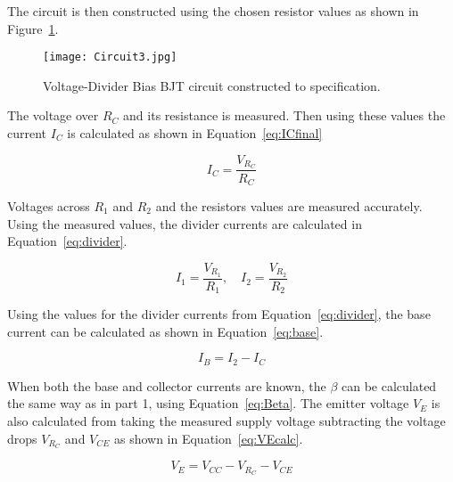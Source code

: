 \documentclass{article}
\begin{document}
The circuit is then constructed using the chosen resistor values as shown in Figure~\ref{fig:circuit3}.

\begin{figure}[H]
    \centering
    \texttt{[image: Circuit3.jpg]}
    \caption{Voltage-Divider Bias BJT circuit constructed to specification.}
    \label{fig:circuit3}
\end{figure}

The voltage over \(R_C\) and its resistance is measured. Then using these values the current \(I_C\) is calculated as shown in Equation~\ref{eq:ICfinal}

\begin{equation}
    \label{eq:ICfinal}
    I_C = \frac{V_{R_C}}{R_C}
\end{equation}


Voltages across \(R_1\) and \(R_2\) and the resistors values are measured accurately.
Using the measured values, the divider currents are calculated in Equation~\ref{eq:divider}.

\begin{equation}
    \label{eq:divider}
    I_1 = \frac{V_{R_1}}{R_1}, \quad
    I_2 = \frac{V_{R_2}}{R_2}
\end{equation}

Using the values for the divider currents from Equation~\ref{eq:divider}, the base current can be calculated as shown in Equation~\ref{eq:base}.

\begin{equation}
\label{eq:base}
I_B = I_2 - I_C
\end{equation}

When both the base and collector currents are known, the \(\beta\) can be calculated the same way as in part 1, using Equation~\ref{eq:Beta}.
The emitter voltage \(V_E\) is also calculated from taking the measured supply voltage subtracting the voltage drops \(V_{R_C}\) and \(V_{CE}\) as shown in Equation~\ref{eq:VEcalc}.

\begin{equation}
\label{eq:VEcalc}
V_E = V_{CC} - V_{R_C} - V_{CE}
\end{equation}
\end{document}
